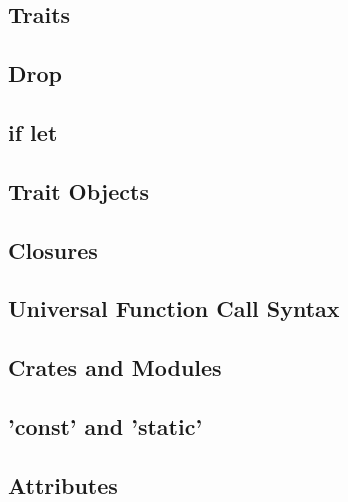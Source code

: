 \subsection{Traits}
\label{sec:syntax_traits}


\subsection{Drop}
\label{sec:syntax_drop}


\subsection{if let}
\label{sec:syntax_iflet}


\subsection{Trait Objects}
\label{sec:syntax_traitObjects}


\subsection{Closures}
\label{sec:syntax_closures}


\subsection{Universal Function Call Syntax}
\label{sec:syntax_universalFunctionCallSyntax}


\subsection{Crates and Modules}
\label{sec:syntax_cratesAndModules}


\subsection{'const' and 'static'}
\label{sec:syntax_constAndStatic}


\subsection{Attributes}
\label{sec:syntax_attributes}


